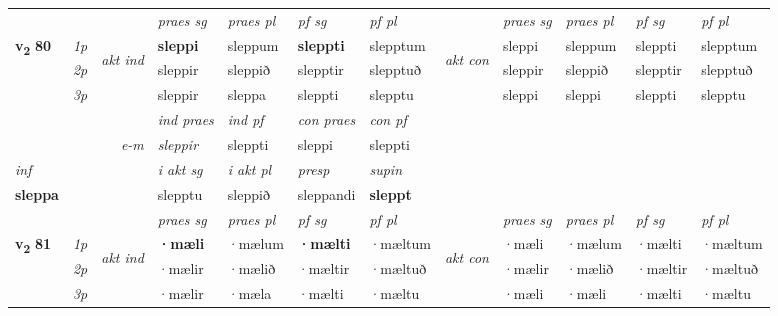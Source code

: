 \begin{longtable}[l]{X>{\footnotesize\itshape}llXXXXlXXXX}
 & &   & \textit{praes sg}  & \textit{praes pl}    & \textit{ pf sg} & \textit{pf pl} & & \textit{praes sg}  & \textit{praes pl}    & \textit{pf sg} & \textit{pf pl }  \\ \cmidrule{4-7} \cmidrule{9-12}
 \multirow{2}{*}{{{\textbf{v{\textsubscript{2}}} \Large{\textbf{80}}}}}  & 1p & \multirow{3}{*}{\begin{turn}{90}\textit{akt ind}\end{turn}} & \textbf{sleppi} & sleppum & \textbf{sleppti} & slepptum & \multirow{3}{*}{\begin{turn}{90}\textit{akt con}\end{turn}} &sleppi & sleppum & sleppti & slepptum\\*
 & 2p &  &  sleppir  & sleppið & slepptir & slepptuð & & sleppir & sleppið & slepptir & slepptuð \\*
 & 3p &  & sleppir & sleppa & sleppti & slepptu & & sleppi & sleppi& sleppti & slepptu \\*
\cmidrule{4-7} \cmidrule{9-12}

   && &  \textit{ind praes} & \textit{ind pf} & \textit{con praes} & \textit{con pf} \\*
\multicolumn{3}{r}{\textit{e-m}} & sleppir & sleppti & sleppi & sleppti \\*

\cmidrule{4-7}
   {\textit{inf}} & &  & \textit{i akt sg} & \textit{i akt pl}   & \textit{presp} & \textit{supin}   \\*
  {\textbf{sleppa}} & && slepptu  & sleppið   & sleppandi &  \textbf{sleppt}   \\*

\midrule

 & &   & \textit{praes sg}  & \textit{praes pl}    & \textit{ pf sg} & \textit{pf pl} & & \textit{praes sg}  & \textit{praes pl}    & \textit{pf sg} & \textit{pf pl }  \\ \cmidrule{4-7} \cmidrule{9-12}
 \multirow{2}{*}{{{\textbf{v{\textsubscript{2}}} \Large{\textbf{81}}}}}  & 1p & \multirow{3}{*}{\begin{turn}{90}\textit{akt ind}\end{turn}} & \textbf{·mæli} & ·mælum & \textbf{·mælti} & ·mæltum & \multirow{3}{*}{\begin{turn}{90}\textit{akt con}\end{turn}} &·mæli & ·mælum & ·mælti & ·mæltum\\*
 & 2p &  &  ·mælir  & ·mælið & ·mæltir & ·mæltuð & & ·mælir & ·mælið & ·mæltir & ·mæltuð \\*
 & 3p &  & ·mælir & ·mæla & ·mælti & ·mæltu & & ·mæli & ·mæli& ·mælti & ·mæltu \\*
\cmidrule{4-7} \cmidrule{9-12}


\end{longtable}
